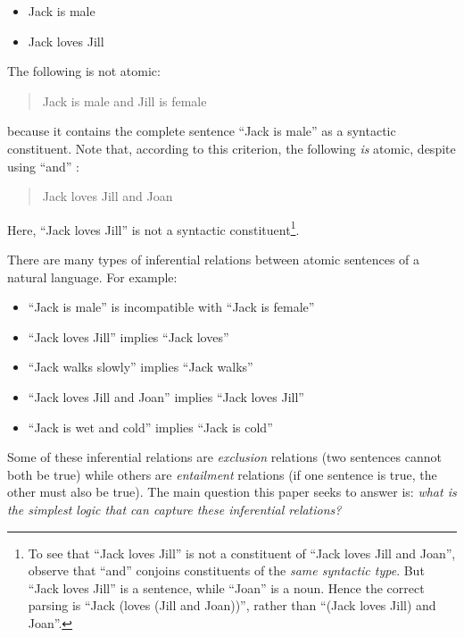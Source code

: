 \begin{itemize}

\item Jack is male
\item Jack loves Jill
\end{itemize}

\NI The following is not atomic:

\begin{quote}
  Jack is male and Jill is female
\end{quote}

\NI because it contains the complete sentence ``Jack is male'' as a
syntactic constituent.  Note that, according to this criterion, the
following \emph{is} atomic, despite using ``and'' :

\begin{quote}
  Jack loves Jill and Joan
\end{quote}

\NI Here, ``Jack loves Jill'' is not a syntactic constituent\footnote{To see that ``Jack loves Jill'' is not a constituent of ``Jack loves Jill and Joan'', observe that ``and'' conjoins constituents of the \emph{same syntactic type}. But ``Jack loves Jill'' is a sentence, while ``Joan'' is a noun. Hence the correct parsing is ``Jack (loves (Jill and Joan))'', rather than ``(Jack loves Jill) and Joan''.}.

There are many types of inferential relations between atomic
sentences of a natural language.  For example:

\begin{itemize}

\item ``Jack is male'' is incompatible with ``Jack is female''
\item ``Jack loves Jill'' implies ``Jack loves''
\item ``Jack walks slowly'' implies ``Jack walks''
\item ``Jack loves Jill and Joan'' implies ``Jack loves Jill''
\item ``Jack is wet and cold'' implies ``Jack is cold''

\end{itemize}

\NI Some of these inferential relations are \emph{exclusion}
relations (two sentences cannot both be true) while others are
\emph{entailment} relations (if one sentence is true, the other must
also be true).  The main question this paper seeks to answer is:
\emph{what is the simplest logic that can capture these inferential
  relations?}


